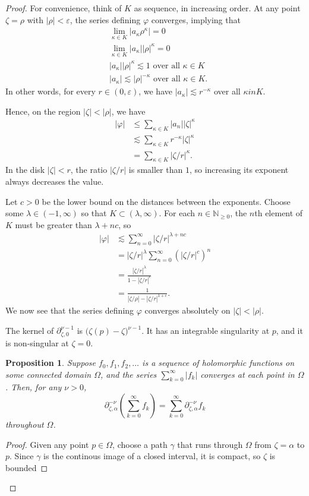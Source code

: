 \documentclass{article}
\theoremstyle{definition}
\theoremstyle{plain}
\newtheorem{prop}[definition]{Proposition}
\newenvironment{verify}{\color{ForestGreen}}{\color{black}}
\begin{document}
\begin{proof}
\begin{verify}
For convenience, think of $K$ as sequence, in increasing order. At any point $\zeta = \rho$ with $|\rho| < \varepsilon$, the series defining $\varphi$ converges, implying that
\begin{align*}
& \lim_{\kappa \in K} |a_\kappa \rho^\kappa| = 0 \\
& \lim_{\kappa \in K} |a_\kappa| |\rho|^\kappa = 0 \\
& |a_\kappa| |\rho|^\kappa \lesssim 1 \text{ over all } \kappa \in K \\
& |a_\kappa| \lesssim |\rho|^{-\kappa} \text{ over all } \kappa \in K.
\end{align*}
In other words, for every $r \in (0, \varepsilon)$, we have $|a_\kappa| \lesssim r^{-\kappa}$ over all $\kappa in K$.

Hence, on the region $|\zeta| < |\rho|$, we have
\begin{align*}
|\varphi| & \le \sum_{\kappa \in K} |a_n| |\zeta|^\kappa \\
& \lesssim \sum_{\kappa \in K} r^{-\kappa} |\zeta|^\kappa \\
& = \sum_{\kappa \in K} |\zeta/r|^\kappa.
\end{align*}
In the disk $|\zeta| < r$, the ratio $|\zeta/r|$ is smaller than $1$, so increasing its exponent always decreases the value.

Let $c > 0$ be the lower bound on the distances between the exponents. Choose some $\lambda \in (-1, \infty)$ so that $K \subset (\lambda, \infty)$. For each $n \in \mathbb{N}_{\ge 0}$, the $n$th element of $K$ must be greater than $\lambda + nc$, so
\begin{align*}
|\varphi| & \lesssim \sum_{n = 0}^\infty |\zeta/r|^{\lambda + nc} \\
& = |\zeta/r|^\lambda \sum_{n = 0}^\infty (|\zeta/r|^c)^n \\
& = \frac{|\zeta/r|^\lambda}{1 - |\zeta/r|^c} \\
& = \frac{1}{|\zeta/\rho| - |\zeta/r|^{1+c}}.
\end{align*}
We now see that the series defining $\varphi$ converges absolutely on $|\zeta| < |\rho|$.

The kernel of $\partial_{\zeta, 0}^{\nu-1}$ is $\big(\zeta(p) - \zeta\big)^{\nu-1}$. It has an integrable singularity at $p$, and it is non-singular at $\zeta = 0$.
\end{verify}

\begin{prop}
Suppose $f_0, f_1, f_2, \ldots$ is a sequence of holomorphic functions on some connected domain $\Omega$, and the series $\sum_{k=0}^\infty |f_k|$ converges at each point in $\Omega$. Then, for any $\nu > 0$,
\[ \partial_{\zeta, \alpha}^{-\nu} \left( \sum_{k=0}^\infty f_k \right) = \sum_{k=0}^\infty \partial_{\zeta, \alpha}^{-\nu} f_k \]
throughout $\Omega$.
\end{prop}
\begin{proof}
Given any point $p \in \Omega$, choose a path $\gamma$ that runs through $\Omega$ from $\zeta = \alpha$ to $p$. Since $\gamma$ is the continous image of a closed interval, it is compact, so $\zeta$ is bounded


\end{proof}
\end{proof}
\end{document}
